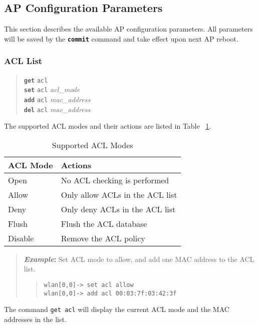 \documentclass[10pt,fullpage]{article}
\newcommand{\mytt}[1]{{\texttt{#1}}}
\newcommand{\bv}{\begin{verse}}
\newcommand{\ev}{\end{verse}}
\newcommand{\clicmd}[1]{{\textbf{\texttt{#1}}}}
\newcommand{\cliparam}[1]{{\texttt{#1}}}
\newcommand{\clival}[1]{{\emph{#1}}}
\newcommand{\clidemo}[1]{{\texttt{wlan[0,0]-> #1}}}
\newenvironment{example}{\begin{quote}\textbf{\textit{Example}:}}{\end{quote}}
\begin{document}
\subsection{AP Configuration Parameters}
\label{sec:param}
This section describes the available AP configuration parameters.  All
parameters will be saved by the \clicmd{commit} command and take
effect upon next AP reboot.

\subsubsection{ACL List}
\bv
\clicmd{get} \cliparam{acl}\\
\clicmd{set} \cliparam{acl} \clival{acl\_mode}\\
\clicmd{add} \cliparam{acl} \clival{mac\_address}\\
\clicmd{del} \cliparam{acl} \clival{mac\_address}
\ev
The supported ACL modes and their actions are listed in Table ~\ref{tab:acl}.
\begin{table}[h*]
  \centering
  \begin{tabular}{|l|l|} \hline
    ACL Mode & Actions \\ \hline
    Open & No ACL checking is performed \\
    Allow & Only allow ACLs in the ACL list \\
    Deny & Only deny ACLs in the ACL list \\
    Flush & Flush the ACL database \\
    Disable & Remove the ACL policy \\ \hline
  \end{tabular}
  \caption{Supported ACL Modes}
  \label{tab:acl}
\end{table}

\begin{example}
  Set ACL mode to allow, and add one MAC address to the ACL list.
  \bv
  \clidemo{set acl allow}\\
  \clidemo{add acl 00:03:7f:03:42:3f}
  \ev
\end{example}

The command \mytt{get acl} will display the current ACL mode and the
MAC addresses in the list.
\end{document}
